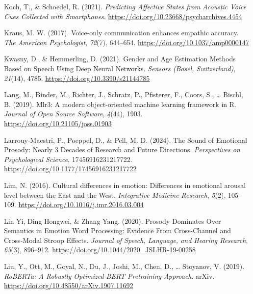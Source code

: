 \documentclass[
  english,
  man,floatsintext]{apa6}
\newlength{\cslhangindent}
\newenvironment{CSLReferences}[2] %
 {%
  \setlength{\parindent}{0pt}
  \ifodd #1 \everypar{\setlength{\hangindent}{\cslhangindent}}\ignorespaces\fi
  \ifnum #2 > 0
  \setlength{\parskip}{#2\baselineskip}
  \fi
 }%
 {}
\begin{document}
\begin{CSLReferences}{1}{0}
\leavevmode{}%
Koch, T., \& Schoedel, R. (2021). \emph{Predicting {Affective States} from {Acoustic Voice Cues Collected} with {Smartphones}}. \url{https://doi.org/10.23668/psycharchives.4454}

\leavevmode{}%
Kraus, M. W. (2017). Voice-only communication enhances empathic accuracy. \emph{The American Psychologist}, \emph{72}(7), 644--654. \url{https://doi.org/10.1037/amp0000147}

\leavevmode{}%
Kwasny, D., \& Hemmerling, D. (2021). Gender and {Age Estimation Methods Based} on {Speech Using Deep Neural Networks}. \emph{Sensors (Basel, Switzerland)}, \emph{21}(14), 4785. \url{https://doi.org/10.3390/s21144785}

\leavevmode{}%
Lang, M., Binder, M., Richter, J., Schratz, P., Pfisterer, F., Coors, S., \ldots{} Bischl, B. (2019). Mlr3: {A} modern object-oriented machine learning framework in {R}. \emph{Journal of Open Source Software}, \emph{4}(44), 1903. \url{https://doi.org/10.21105/joss.01903}

\leavevmode{}%
Larrouy-Maestri, P., Poeppel, D., \& Pell, M. D. (2024). The {Sound} of {Emotional Prosody}: {Nearly} 3 {Decades} of {Research} and {Future Directions}. \emph{Perspectives on Psychological Science}, 17456916231217722. \url{https://doi.org/10.1177/17456916231217722}

\leavevmode{}%
Lim, N. (2016). Cultural differences in emotion: Differences in emotional arousal level between the {East} and the {West}. \emph{Integrative Medicine Research}, \emph{5}(2), 105--109. \url{https://doi.org/10.1016/j.imr.2016.03.004}

\leavevmode{}%
Lin Yi, Ding Hongwei, \& Zhang Yang. (2020). Prosody {Dominates Over Semantics} in {Emotion Word Processing}: {Evidence From Cross-Channel} and {Cross-Modal Stroop Effects}. \emph{Journal of Speech, Language, and Hearing Research}, \emph{63}(3), 896--912. \url{https://doi.org/10.1044/2020_JSLHR-19-00258}

\leavevmode{}%
Liu, Y., Ott, M., Goyal, N., Du, J., Joshi, M., Chen, D., \ldots{} Stoyanov, V. (2019). \emph{{RoBERTa}: {A Robustly Optimized BERT Pretraining Approach}}. arXiv. \url{https://doi.org/10.48550/arXiv.1907.11692}


\end{CSLReferences}
\end{document}
